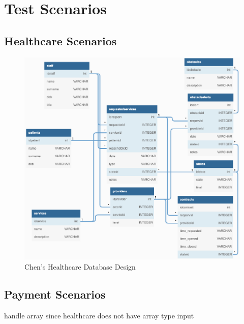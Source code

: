 \section{Test Scenarios}
\subsection{Healthcare Scenarios}
\begin{figure}[ht]
    \centering
    \includegraphics[width=\textwidth]{overleaf/images/chens_healthcare_db_design.png}
    \caption{Chen's Healthcare Database Design}
    \label{fig:chens_healthcare_db_design}
\end{figure}

\subsection{Payment Scenarios}

handle array since healthcare does not have array type input

